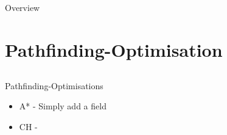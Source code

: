 \section*{}

\begin{frame}{Overview}
    \tableofcontents
\end{frame}

\usetikzlibrary{decorations.text}



\section{Pathfinding-Optimisation}
\subsection*{}
\begin{frame}{Pathfinding-Optimisations}
    \begin{itemize}
        \item A* - Simply add a field
        \item CH - 
    \end{itemize}
\end{frame}
